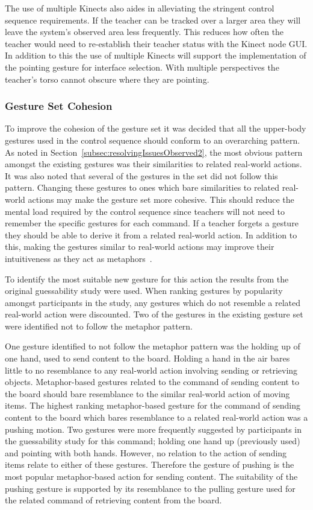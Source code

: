 \documentclass[link]{IWCOMP}
\begin{document}
The use of multiple Kinects also aides in alleviating the stringent control sequence requirements.
If the teacher can be tracked over a larger area they will leave the system's observed area less frequently.
This reduces how often the teacher would need to re-establish their teacher status with the Kinect node GUI.
In addition to this the use of multiple Kinects will support the implementation of the pointing gesture for interface selection.
With multiple perspectives the teacher's torso cannot obscure where they are pointing.

\subsubsection{Gesture Set Cohesion} 
\label{subsubsec:studyImplementationGestureSet}

To improve the cohesion of the gesture set it was decided that all the upper-body gestures used in the control sequence should conform to an overarching pattern.
As noted in Section~\ref{subsec:resolvingIssuesObserved2}, the most obvious pattern amongst the existing gestures was their similarities to related real-world actions.
It was also noted that several of the gestures in the set did not follow this pattern.
Changing these gestures to ones which bare similarities to related real-world actions may make the gesture set more cohesive.
This should reduce the mental load required by the control sequence since teachers will not need to remember the specific gestures for each command.
If a teacher forgets a gesture they should be able to derive it from a related real-world action.
In addition to this, making the gestures similar to real-world actions may improve their intuitiveness as they act as metaphors~\cite{Wang2008}.

To identify the most suitable new gesture for this action the results from the original guessability study were used.
When ranking gestures by popularity amongst participants in the study, any gestures which do not resemble a related real-world action were discounted.
Two of the gestures in the existing gesture set were identified not to follow the metaphor pattern.

One gesture identified to not follow the metaphor pattern was the holding up of one hand, used to send content to the board.
Holding a hand in the air bares little to no resemblance to any real-world action involving sending or retrieving objects.
Metaphor-based gestures related to the command of sending content to the board should bare resemblance to the similar real-world action of moving items.
The highest ranking metaphor-based gesture for the command of sending content to the board which bares resemblance to a related real-world action was a pushing motion.
Two gestures were more frequently suggested by participants in the guessability study for this command; holding one hand up (previously used) and pointing with both hands.
However, no relation to the action of sending items relate to either of these gestures.
Therefore the gesture of pushing is the most popular metaphor-based action for sending content.
The suitability of the pushing gesture is supported by its resemblance to the pulling gesture used for the related command of retrieving content from the board.
\end{document}
